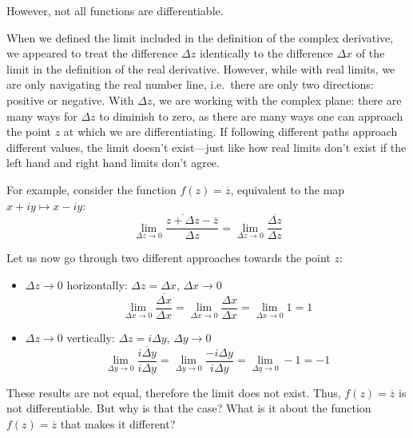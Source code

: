 \documentclass[10pt]{scrartcl}
\numberwithin{equation}{subsection}
\theoremstyle{definition}
\theoremstyle{remark}
\newcommand*{\conjugate}[1]{\overline{#1}}
\begin{document}
However, not all functions are differentiable. 

When we defined the limit included in the definition of the complex derivative,
we appeared to treat
the difference $\Delta z$  identically to the difference $\Delta x$ of the
limit in the definition of the real derivative.
However, while with real limits, we are only navigating the real number line,
i.e.\ there are only two directions: positive or negative. With $\Delta z$, we
are working with the complex plane: there are many ways for $\Delta z$ to
diminish to zero, as there are many ways one can approach the point $z$ at
which we are differentiating. If following different paths approach different
values, the limit doesn't exist---just like how real limits don't exist if the
left hand and right hand limits don't agree. 

For example, consider the
function $f(z) = \conjugate{z}$, equivalent to the map $x+iy \mapsto x-iy$:
\[
	\lim_{\Delta z \to 0} \frac{\conjugate{z + \Delta z} -
	\conjugate{z}}{\Delta z} = \lim_{\Delta z \to 0}
	\frac{\conjugate{\Delta z}}{\Delta z}
\]

Let us now go through two different approaches towards the point $z$:
\begin{itemize}
	\item $\Delta z \to 0$ horizontally: $\Delta z = \Delta x$, $\Delta x \to 0$
		\[
			\lim_{\Delta x \to 0} \frac{\conjugate{\Delta x}}{\Delta x} = 
			\lim_{\Delta x \to 0} \frac{\Delta x}{\Delta x} = \lim_{\Delta x \to 0} 1 = 1
		\] 
	\item $\Delta z \to 0$ vertically: $\Delta z = i\Delta y$, $\Delta y \to 0$
		\[
			\lim_{\Delta y \to 0} \frac{\conjugate{i \Delta y}}{i \Delta y} = 
			\lim_{\Delta y \to 0} \frac{- i\Delta y}{i\Delta y} = \lim_{\Delta y \to 0}-1 = -1
		\]
\end{itemize}
These results are not equal, therefore the limit does not exist. Thus,
$f(z)=\conjugate{z}$ is not differentiable.
But why is that the case? What is it about the function
$f(z)=\conjugate{z}$ that makes it different?
\end{document}
